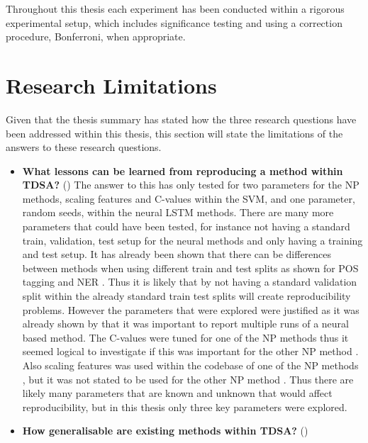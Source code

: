 Throughout this thesis each experiment has been conducted within a rigorous experimental setup, which includes significance testing and using a correction procedure, Bonferroni, when appropriate.

\section{Research Limitations}
Given that the thesis summary has stated how the three research questions have been addressed within this thesis, this section will state the limitations of the answers to these research questions. 

\begin{itemize}
    \item \textbf{What lessons can be learned from reproducing a method within TDSA?} ()\newline
    The answer to this has only tested for two parameters for the NP methods, scaling features and C-values within the SVM, and one parameter, random seeds, within the neural LSTM methods. There are many more parameters that could have been tested, for instance not having a standard train, validation, test setup for the neural methods and only having a training and test setup. It has already been shown that there can be differences between methods when using different train and test splits as shown for POS tagging \citep{gorman-bedrick-2019-need} and NER \citep{moss-etal-2019-fiesta}. Thus it is likely that by not having a standard validation split within the already standard train test splits will create reproducibility problems. However the parameters that were explored were justified as it was already shown by \citet{reimers-gurevych-2017-reporting} that it was important to report multiple runs of a neural based method. The C-values were tuned for one of the NP methods \citep{vo2015target} thus it seemed logical to investigate if this was important for the other NP method \citep{wang-etal-2017-tdparse}. Also scaling features was used within the codebase of one of the NP methods \citep{wang-etal-2017-tdparse}, but it was not stated to be used for the other NP method \citep{vo2015target}. Thus there are likely many parameters that are known and unknown that would affect reproducibility, but in this thesis only three key parameters were explored.  
    \item \textbf{How generalisable are existing methods within TDSA?} ()\newline

\end{itemize}

